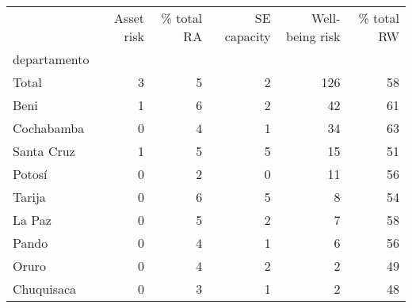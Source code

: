 \begin{tabular}{lrrrrr}
\toprule
{} &  Asset risk &  \% total RA &  SE capacity &  Well-being risk &  \% total RW \\
departamento &             &             &              &                  &             \\
\midrule
Total        &           3 &           5 &            2 &              126 &          58 \\
Beni         &           1 &           6 &            2 &               42 &          61 \\
Cochabamba   &           0 &           4 &            1 &               34 &          63 \\
Santa Cruz   &           1 &           5 &            5 &               15 &          51 \\
Potosí       &           0 &           2 &            0 &               11 &          56 \\
Tarija       &           0 &           6 &            5 &                8 &          54 \\
La Paz       &           0 &           5 &            2 &                7 &          58 \\
Pando        &           0 &           4 &            1 &                6 &          56 \\
Oruro        &           0 &           4 &            2 &                2 &          49 \\
Chuquisaca   &           0 &           3 &            1 &                2 &          48 \\
\bottomrule
\end{tabular}
